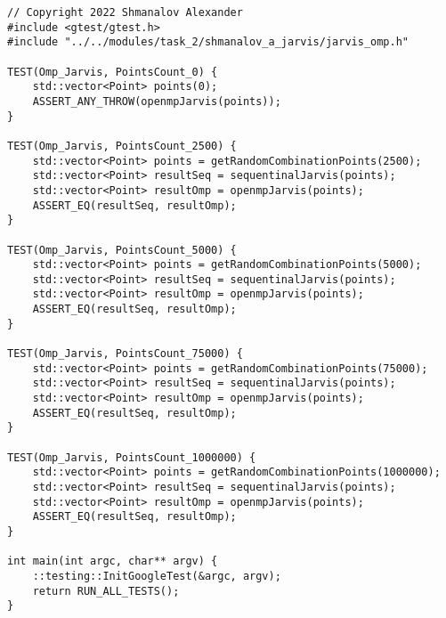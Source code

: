 \documentclass{report}
\begin{document}
\begin{lstlisting}
// Copyright 2022 Shmanalov Alexander
#include <gtest/gtest.h>
#include "../../modules/task_2/shmanalov_a_jarvis/jarvis_omp.h"

TEST(Omp_Jarvis, PointsCount_0) {
    std::vector<Point> points(0);
    ASSERT_ANY_THROW(openmpJarvis(points));
}

TEST(Omp_Jarvis, PointsCount_2500) {
    std::vector<Point> points = getRandomCombinationPoints(2500);
    std::vector<Point> resultSeq = sequentinalJarvis(points);
    std::vector<Point> resultOmp = openmpJarvis(points);
    ASSERT_EQ(resultSeq, resultOmp);
}

TEST(Omp_Jarvis, PointsCount_5000) {
    std::vector<Point> points = getRandomCombinationPoints(5000);
    std::vector<Point> resultSeq = sequentinalJarvis(points);
    std::vector<Point> resultOmp = openmpJarvis(points);
    ASSERT_EQ(resultSeq, resultOmp);
}

TEST(Omp_Jarvis, PointsCount_75000) {
    std::vector<Point> points = getRandomCombinationPoints(75000);
    std::vector<Point> resultSeq = sequentinalJarvis(points);
    std::vector<Point> resultOmp = openmpJarvis(points);
    ASSERT_EQ(resultSeq, resultOmp);
}

TEST(Omp_Jarvis, PointsCount_1000000) {
    std::vector<Point> points = getRandomCombinationPoints(1000000);
    std::vector<Point> resultSeq = sequentinalJarvis(points);
    std::vector<Point> resultOmp = openmpJarvis(points);
    ASSERT_EQ(resultSeq, resultOmp);
}

int main(int argc, char** argv) {
    ::testing::InitGoogleTest(&argc, argv);
    return RUN_ALL_TESTS();
}
\end{lstlisting}
\end{document}
